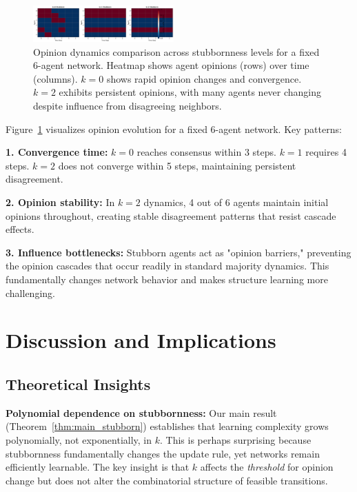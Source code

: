 \documentclass[conference]{IEEEtran}
\begin{document}
\begin{figure}[t]
\centering
\includegraphics[width=0.48\textwidth]{dynamics_comparison.png}
\caption{Opinion dynamics comparison across stubbornness levels for a fixed 6-agent network. Heatmap shows agent opinions (rows) over time (columns). $k=0$ shows rapid opinion changes and convergence. $k=2$ exhibits persistent opinions, with many agents never changing despite influence from disagreeing neighbors.}
\label{fig:dynamics}
\end{figure}

Figure~\ref{fig:dynamics} visualizes opinion evolution for a fixed 6-agent network. Key patterns:

\textbf{1. Convergence time:} $k=0$ reaches consensus within 3 steps. $k=1$ requires 4 steps. $k=2$ does not converge within 5 steps, maintaining persistent disagreement.

\textbf{2. Opinion stability:} In $k=2$ dynamics, 4 out of 6 agents maintain initial opinions throughout, creating stable disagreement patterns that resist cascade effects.

\textbf{3. Influence bottlenecks:} Stubborn agents act as "opinion barriers," preventing the opinion cascades that occur readily in standard majority dynamics. This fundamentally changes network behavior and makes structure learning more challenging.

\section{Discussion and Implications}
\label{sec:discussion}

\subsection{Theoretical Insights}

\textbf{Polynomial dependence on stubbornness:} Our main result (Theorem~\ref{thm:main_stubborn}) establishes that learning complexity grows polynomially, not exponentially, in $k$. This is perhaps surprising because stubbornness fundamentally changes the update rule, yet networks remain efficiently learnable. The key insight is that $k$ affects the \emph{threshold} for opinion change but does not alter the combinatorial structure of feasible transitions.
\end{document}
